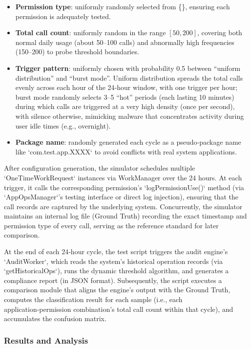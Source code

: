 \begin{itemize}
\item \textbf{Permission type}: uniformly randomly selected from \{\}, ensuring each permission is adequately tested.
\item \textbf{Total call count}: uniformly random in the range $[50, 200]$, covering both normal daily usage (about 50–100 calls) and abnormally high frequencies (150–200) to probe threshold boundaries.
\item \textbf{Trigger pattern}: uniformly chosen with probability 0.5 between “uniform distribution” and “burst mode”. Uniform distribution spreads the total calls evenly across each hour of the 24‑hour window, with one trigger per hour; burst mode randomly selects 3–5 “hot” periods (each lasting 10 minutes) during which calls are triggered at a very high density (once per second), with silence otherwise, mimicking malware that concentrates activity during user idle times (e.g., overnight).
\item \textbf{Package name}: randomly generated each cycle as a pseudo‑package name like `com.test.app.XXXX` to avoid conflicts with real system applications.
\end{itemize}

After configuration generation, the simulator schedules multiple `OneTimeWorkRequest` instances via WorkManager over the 24 hours. At each trigger, it calls the corresponding permission's `logPermissionUse()` method (via `AppOpsManager`'s testing interface or direct log injection), ensuring that the call records are captured by the underlying system. Concurrently, the simulator maintains an internal log file (Ground Truth) recording the exact timestamp and permission type of every call, serving as the reference standard for later comparison.

At the end of each 24‑hour cycle, the test script triggers the audit engine's `AuditWorker`, which reads the system's historical operation records (via `getHistoricalOps`), runs the dynamic threshold algorithm, and generates a compliance report (in JSON format). Subsequently, the script executes a comparison module that aligns the engine's output with the Ground Truth, computes the classification result for each sample (i.e., each application‑permission combination's total call count within that cycle), and accumulates the confusion matrix.

\subsubsection{Results and Analysis}

